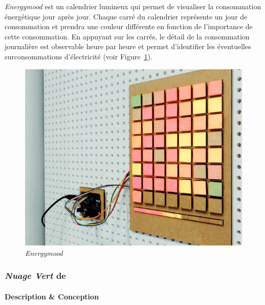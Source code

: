 \documentclass[10pt,a5paper,twoside]{article}
\begin{document}
\emph{Energymood} est un calendrier lumineux qui permet de visualiser la
consommation énergétique jour après jour. Chaque carré du calendrier
représente un jour de consommation et prendra une couleur différente en
fonction de l'importance de cette consommation. En appuyant sur les
carrés, le détail de la consommation journalière est observable heure
par heure et permet d'identifier les éventuelles surconsommations
d'électricité (voir Figure~\ref{fig:energymood1}).

\begin{figure}
\centering
\includegraphics[]{images/energymood-screenshot1.png}
\caption{\emph{Energymood}}\label{fig:energymood1}
\end{figure}

\subsubsection{\emph{Nuage Vert} de
\citet{evans2009artful}}\label{nuage-vert-de-evans2009artful}

\paragraph{Description \& Conception}\label{description-conception}
\end{document}
